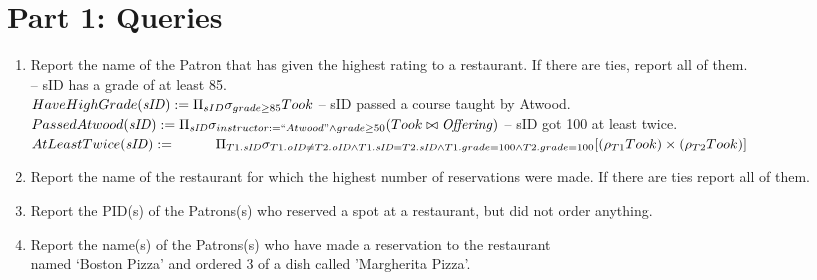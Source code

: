\documentclass{article}
\newcommand{\var}[1]{\mathit{#1}}
\begin{document}
\section*{Part 1: Queries}

\begin{enumerate}

\item   %
Report the name of the Patron that has given the highest rating to a restaurant.  If there are ties, report all of them.  \\

{\large %
-- sID has a grade of at least 85. \\[5pt]
$
HaveHighGrade(\var{sID}) := 
	\Pi_{sID} 
	\sigma_{grade \ge 85} 
	Took \\[10pt]
$
-- sID passed a course taught by Atwood. \\[5pt]
$
PassedAtwood(\var{sID}) := 
	\Pi_{\var{sID}} 
	\sigma_{instructor := ``Atwood" \wedge grade \ge 50} 
	(Took \bowtie \var{Offering}) 
	\\[10pt]
$
-- sID got 100 at least twice. \\[5pt]
$
AtLeastTwice(\var{sID}) := \\[5pt]  %
	\hspace*{1cm}  %
	\Pi_{T1.\var{sID}} 
	\sigma_{
		T1.\var{oID} \neq T2.\var{oID} \wedge 
		T1.\var{sID} = T2.\var{sID} \wedge 
		T1.grade = 100 \wedge T2.grade = 100}
	[ (\rho_{T1}Took) \times (\rho_{T2}Took) ] \\[5pt]
$
} %


\item   %
Report the name of the restaurant for which the highest number of reservations were made. If there are ties report all of them.

\item   %
Report the PID(s) of the Patrons(s) who reserved a spot at a restaurant, but did not order anything.

\item   %
Report the name(s) of the Patrons(s) who have made a reservation to the restaurant\\ named `Boston Pizza' and ordered 3 of a dish called 'Margherita Pizza'.


\end{enumerate}
\end{document}
